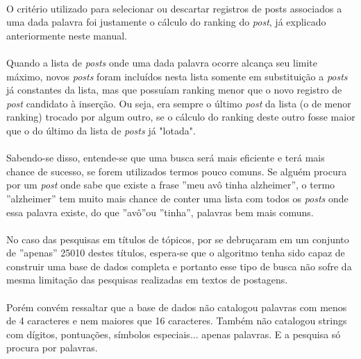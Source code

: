 \documentclass[a4paper,12pt,openany]{book}
\begin{document}
\paragraph{}
O critério utilizado para selecionar ou descartar registros de posts associados a uma dada palavra foi justamente o cálculo do ranking do \textit{post}, já explicado anteriormente neste manual.
\paragraph{}
 Quando a lista de \textit{posts} onde uma dada palavra ocorre alcança seu limite máximo, novos \textit{posts} foram incluídos nesta lista somente em substituição a \textit{posts} já constantes da lista, mas que possuíam ranking menor que o novo registro de \textit{post} candidato à inserção. Ou seja, era sempre o último \textit{post} da lista (o de menor ranking) trocado por algum outro, se o cálculo do ranking deste outro fosse maior que o do último da lista de \textit{posts} já "lotada".
\paragraph{}
Sabendo-se disso, entende-se que uma busca será mais eficiente e terá mais chance de sucesso, se forem utilizados termos pouco comuns. Se alguém procura por um \textit{post} onde sabe que existe a frase ”meu avô tinha alzheimer”, o termo ”alzheimer” tem muito mais chance de conter uma lista com todos os
\textit{posts} onde essa palavra existe, do que ”avô”ou ”tinha”, palavras bem mais comuns.
\paragraph{}
No caso das pesquisas em títulos de tópicos, por se debruçaram em um conjunto de ”apenas” 25010 destes títulos, espera-se que o algoritmo tenha sido capaz de construir uma base de dados completa e portanto
esse tipo de busca não sofre da mesma limitação das pesquisas realizadas em textos de postagens.
\paragraph{}
Porém convém ressaltar que a base de dados não catalogou palavras com menos de 4 caracteres e nem maiores que 16 caracteres. Também não catalogou strings com dígitos, pontuações, símbolos especiais... apenas palavras. E a pesquisa só procura por palavras.


\newpage
\end{document}
